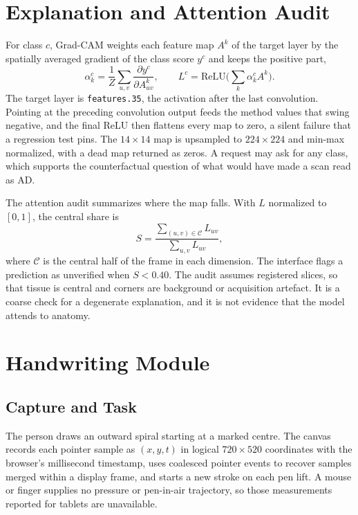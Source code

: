\documentclass[conference]{IEEEtran}
\begin{document}
\section{Explanation and Attention Audit}
For class $c$, Grad-CAM weights each feature map $A^k$ of the target layer by the spatially averaged gradient of the class score $y^c$ and keeps the positive part,
\begin{equation}
\alpha^c_k = \frac{1}{Z}\sum_{u,v}\frac{\partial y^c}{\partial A^k_{uv}}, \qquad
L^c = \mathrm{ReLU}\!\Big(\sum_k \alpha^c_k A^k\Big).
\label{eq:gradcam}
\end{equation}
The target layer is \texttt{features.35}, the activation after the last convolution. Pointing at the preceding convolution output feeds the method values that swing negative, and the final ReLU then flattens every map to zero, a silent failure that a regression test pins. The $14\times14$ map is upsampled to $224\times224$ and min-max normalized, with a dead map returned as zeros. A request may ask for any class, which supports the counterfactual question of what would have made a scan read as AD.

The attention audit summarizes where the map falls. With $L$ normalized to $[0,1]$, the central share is
\begin{equation}
S = \frac{\sum_{(u,v)\in \mathcal{C}} L_{uv}}{\sum_{u,v} L_{uv}},
\label{eq:central}
\end{equation}
where $\mathcal{C}$ is the central half of the frame in each dimension. The interface flags a prediction as unverified when $S<0.40$. The audit assumes registered slices, so that tissue is central and corners are background or acquisition artefact. It is a coarse check for a degenerate explanation, and it is not evidence that the model attends to anatomy.

\section{Handwriting Module}
\subsection{Capture and Task}
The person draws an outward spiral starting at a marked centre. The canvas records each pointer sample as $(x,y,t)$ in logical $720\times520$ coordinates with the browser's millisecond timestamp, uses coalesced pointer events to recover samples merged within a display frame, and starts a new stroke on each pen lift. A mouse or finger supplies no pressure or pen-in-air trajectory, so those measurements reported for tablets \cite{werner,darwin} are unavailable.
\end{document}
